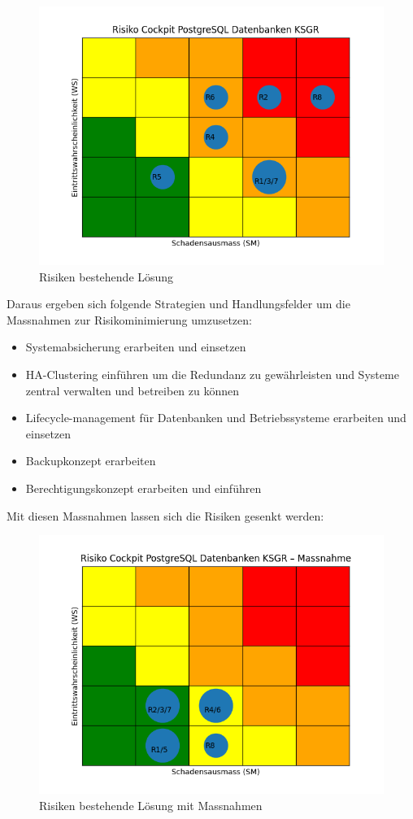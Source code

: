 \begin{figure}[H]
    \centering
    \includegraphics[width=1\linewidth]{source/riskmatrix/riskmatrixproblem}
    \caption{Risiken bestehende Lösung}
    \label{fig:riskmatrixproblem}
\end{figure}


Daraus ergeben sich folgende Strategien und Handlungsfelder um die Massnahmen zur Risikominimierung umzusetzen:
\begin{itemize}
    \item Systemabsicherung erarbeiten und einsetzen
    \item HA-Clustering einführen um die Redundanz zu gewährleisten und Systeme zentral verwalten und betreiben zu können
    \item Lifecycle-management für Datenbanken und Betriebssysteme erarbeiten und einsetzen
    \item Backupkonzept erarbeiten
    \item Berechtigungskonzept erarbeiten und einführen
\end{itemize}

Mit diesen Massnahmen lassen sich die Risiken gesenkt werden:
\begin{figure}[H]
    \centering
    \includegraphics[width=1\linewidth]{source/riskmatrix/Riskmatrixproblem-massnahmen}
    \caption{Risiken bestehende Lösung mit Massnahmen}
    \label{fig:riskmatrixproblem-massnahmen}
\end{figure}
